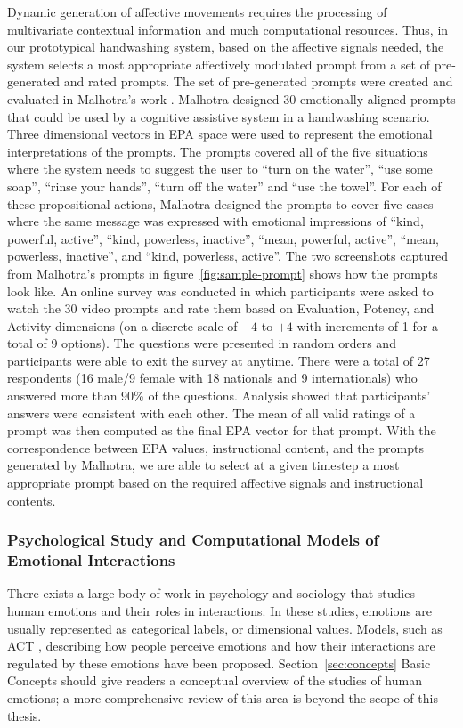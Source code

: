 Dynamic generation of affective movements requires the processing of multivariate contextual information and much computational resources. Thus, in our prototypical handwashing system, based on the affective signals needed, the system selects a most appropriate affectively modulated prompt from a set of pre-generated and rated prompts. The set of pre-generated prompts were created and evaluated in Malhotra's work \cite{malhotra2014}.  Malhotra designed 30 emotionally aligned prompts that could be used by a cognitive assistive system in a handwashing scenario. Three dimensional vectors in EPA space were used to represent the emotional interpretations of the prompts. The prompts covered all of the five situations where the system needs to suggest the user to ``turn on the water'', ``use some soap'', ``rinse your hands'', ``turn off the water'' and ``use the towel''. For each of these propositional actions, Malhotra designed the prompts to cover five cases where the same message was expressed with emotional impressions of ``kind, powerful, active'', ``kind, powerless, inactive'', ``mean, powerful, active'', ``mean, powerless, inactive'', and ``kind, powerless, active''. The two screenshots captured from Malhotra's prompts in figure~\ref{fig:sample-prompt} shows how the prompts look like. An online survey was conducted in which participants were asked to watch the 30 video prompts and rate them based on Evaluation, Potency, and Activity dimensions (on a discrete scale of $-4$ to $+4$ with increments of 1 for a total of 9 options). The questions were presented in random orders and participants were able to exit the survey at anytime. There were a total of 27 respondents (16 male/9 female with 18 nationals and 9 internationals) who answered more than 90\% of the questions. Analysis showed that participants' answers were consistent with each other. The mean of all valid ratings of a prompt was then computed as the final EPA vector for that prompt. With the correspondence between EPA values, instructional content, and the prompts generated by Malhotra, we are able to select at a given timestep a most appropriate prompt based on the required affective signals and instructional contents.

\subsubsection{Psychological Study and Computational Models of Emotional Interactions}

There exists a large body of work in psychology and sociology that studies human emotions and their roles in interactions. In these studies, emotions are usually represented as categorical labels, or dimensional values. Models, such as ACT \cite{robinson2006affect}, describing how people perceive emotions and how their interactions are regulated by these emotions have been proposed. Section~\ref{sec:concepts} Basic Concepts should give readers a conceptual overview of the studies of human emotions; a more comprehensive review of this area is beyond the scope of this thesis.

